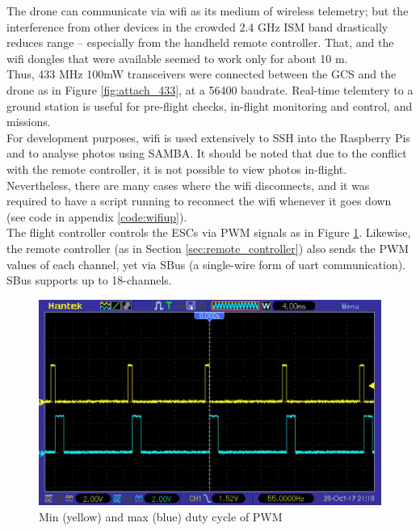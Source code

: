 
The drone can communicate via wifi as its medium of wireless telemetry; but the interference from other devices in the crowded 2.4 GHz ISM band drastically reduces range -- especially from the handheld remote controller. That, and the wifi dongles that were available seemed to work only for about 10 m.\\

Thus, 433 MHz 100mW transceivers were connected between the GCS and the drone as in Figure \ref{fig:attach_433}, at a 56400 baudrate. Real-time telemtery to a ground station is useful for pre-flight checks, in-flight monitoring and control, and missions.\\

For development purposes, wifi is used extensively to SSH into the Raspberry Pis and to analyse photos using SAMBA. It should be noted that due to the conflict with the remote controller, it is not possible to view photos in-flight. Nevertheless, there are many cases where the wifi disconnects, and it was required to have a script running to reconnect the wifi whenever it goes down (see code in appendix \ref{code:wifiup}).\\

The flight controller controls the ESCs via PWM signals as in Figure \ref{fig:pwm}. Likewise, the remote controller (as in Section \ref{sec:remote_controller}) also sends the PWM values of each channel, yet via SBus (a single-wire form of uart communication). SBus supports up to 18-channels.\\

\begin{figure}[H]
\centering
\includegraphics[scale=0.35]{images/pwm.jpg}
\caption{Min (yellow) and max (blue) duty cycle of PWM}
\label{fig:pwm}
\end{figure}

